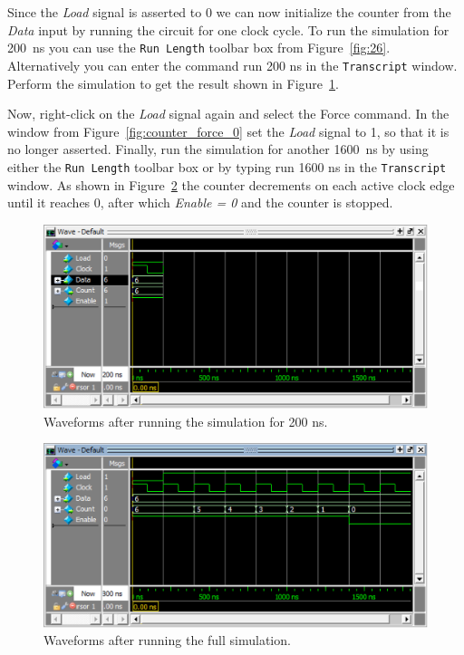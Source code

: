 \documentclass[11pt, twoside, pdftex]{article}
\begin{document}
Since the {\it Load} signal is asserted to 0 we can now initialize the counter from the {\it Data} input 
by running the circuit for one clock cycle. To run the simulation for 200~ns you can use the \texttt{Run
Length} toolbar box from Figure~\ref{fig:26}. Alternatively you can enter the command {\sf run 200 ns} in the
\texttt{Transcript} window. Perform the simulation to get the result shown in Figure~\ref{fig:counter_200ns}.

Now, right-click on the {\it Load} signal again and select the {\sf Force} command. In the window from 
Figure~\ref{fig:counter_force_0} set the {\it Load} signal to 1, so that it is no longer asserted. 
Finally, run the simulation for another 1600~ns by using either the \texttt{Run Length} toolbar box
or by typing {\sf run 1600 ns} in the \texttt{Transcript} window. As shown in 
Figure~\ref{fig:counter_1600ns} the counter decrements on each active clock edge until it reaches 0, after
which {\it Enable = 0} and the counter is stopped. 

\begin{figure}[H]
   \begin{center}
      \includegraphics[scale=.75]{figures/counter_200ns.png}
       \caption{Waveforms after running the simulation for 200 ns.} 
	 \label{fig:counter_200ns}
	 \end{center}
\end{figure}

\begin{figure}[H]
   \begin{center}
      \includegraphics[scale=.75]{figures/counter_1600ns.png}
       \caption{Waveforms after running the full simulation.} 
	 \label{fig:counter_1600ns}
	 \end{center}
\end{figure}
\end{document}
